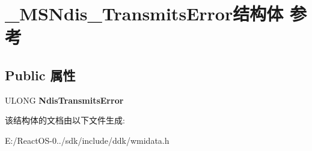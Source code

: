 \hypertarget{struct___m_s_ndis___transmits_error}{}\section{\+\_\+\+M\+S\+Ndis\+\_\+\+Transmits\+Error结构体 参考}
\label{struct___m_s_ndis___transmits_error}
\subsection*{Public 属性}
\begin{DoxyCompactItemize}
\item 
\mbox{\label{struct___m_s_ndis___transmits_error_a3ea37d3a40ad18507a450573ba46a112}} 
U\+L\+O\+NG {\bfseries Ndis\+Transmits\+Error}
\end{DoxyCompactItemize}


该结构体的文档由以下文件生成\+:\begin{DoxyCompactItemize}
\item 
E\+:/\+React\+O\+S-\/0../sdk/include/ddk/wmidata.\+h\end{DoxyCompactItemize}
